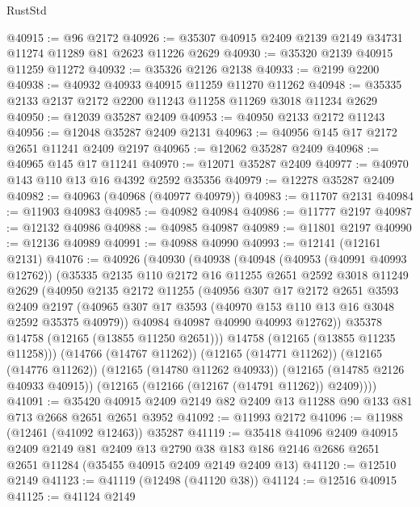 \begin{lexlean}{RustStd}
\begin{coremodule}
@40915 := @96 @2172
@40926 := @35307 @40915 @2409 @2139 @2149 @34731 @11274 @11289 @81 @2623 @11226 @2629
@40930 := @35320 @2139 @40915 @11259 @11272
@40932 := @35326 @2126 @2138
@40933 := @2199 @2200
@40938 := @40932 @40933 @40915 @11259 @11270 @11262
@40948 := @35335 @2133 @2137 @2172 @2200 @11243 @11258 @11269 @3018 @11234 @2629
@40950 := @12039 @35287 @2409
@40953 := @40950 @2133 @2172 @11243
@40956 := @12048 @35287 @2409 @2131
@40963 := @40956 @145 @17 @2172 @2651 @11241 @2409 @2197
@40965 := @12062 @35287 @2409
@40968 := @40965 @145 @17 @11241
@40970 := @12071 @35287 @2409
@40977 := @40970 @143 @110 @13 @16 @4392 @2592 @35356
@40979 := @12278 @35287 @2409
@40982 := @40963 (@40968 (@40977 @40979))
@40983 := @11707 @2131
@40984 := @11903 @40983
@40985 := @40982 @40984
@40986 := @11777 @2197
@40987 := @12132 @40986
@40988 := @40985 @40987
@40989 := @11801 @2197
@40990 := @12136 @40989
@40991 := @40988 @40990
@40993 := @12141 (@12161 @2131)
@41076 := @40926
    (@40930
      (@40938
        (@40948
          (@40953 (@40991 @40993 @12762))
          (@35335
            @2135
            @110
            @2172
            @16
            @11255
            @2651
            @2592
            @3018
            @11249
            @2629
            (@40950
              @2135
              @2172
              @11255
              (@40956
                @307
                @17
                @2172
                @2651
                @3593
                @2409
                @2197
                (@40965 @307 @17 @3593 (@40970 @153 @110 @13 @16 @3048 @2592 @35375 @40979))
                @40984
                @40987
                @40990
                @40993
                @12762))
            @35378
            @14758
            (@12165 (@13855 @11250 @2651)))
          @14758
          (@12165 (@13855 @11235 @11258)))
        (@14766 (@14767 @11262))
        (@12165 (@14771 @11262))
        (@12165 (@14776 @11262))
        (@12165 (@14780 @11262 @40933))
        (@12165 (@14785 @2126 @40933 @40915))
        (@12165 (@12166 (@12167 (@14791 @11262)) @2409))))
@41091 := @35420 @40915 @2409 @2149 @82 @2409 @13 @11288 @90 @133 @81 @713 @2668 @2651 @2651 @3952
@41092 := @11993 @2172
@41096 := @11988 (@12461 (@41092 @12463)) @35287
@41119 := @35418
    @41096
    @2409
    @40915
    @2409
    @2149
    @81
    @2409
    @13
    @2790
    @38
    @183
    @186
    @2146
    @2686
    @2651
    @2651
    @11284
    (@35455 @40915 @2409 @2149 @2409 @13)
@41120 := @12510 @2149
@41123 := @41119 (@12498 (@41120 @38))
@41124 := @12516 @40915
@41125 := @41124 @2149

\end{coremodule}
\end{lexlean}

